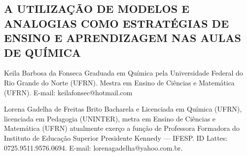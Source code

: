 \begin{refsection}
    \renewcommand{\thefigure}{\arabic{figure}}
    \renewcommand{\thequadro}{\arabic{quadro}}
    
    \chapter[A utilização de modelos e analogias como estratégias de ensino e aprendizagem nas aulas de Química]{A UTILIZAÇÃO DE MODELOS E ANALOGIAS COMO ESTRATÉGIAS DE ENSINO E APRENDIZAGEM NAS AULAS DE QUÍMICA}
    \label{chap:utilizacao-modelos}
    
    \articleAuthor
    {Keila Barbosa da Fonseca}
    {Graduada em Química pela Universidade Federal do Rio Grande do Norte (UFRN). Mestra em Ensino de Ciências e Matemática (UFRN). E-mail: keilafonsec@hotmail.com}
    
    \articleAuthor
    {Lorena Gadelha de Freitas Brito}
    {Bacharela e Licenciada em Química (UFRN), licenciada em Pedagogia (UNINTER), metra em Ensino de Ciências e Matemática (UFRN) atualmente exerço a função de Professora Formadora do Instituto de Educação Superior Presidente Kennedy --- IFESP. ID Lattes: 0725.9511.9576.0694. E-mail: lorenagadelha@yahoo.com.br.}
    

\end{refsection}
